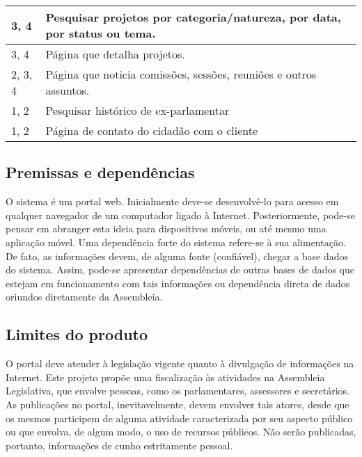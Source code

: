 \documentclass[12pt, a4paper]{article}
\begin{document}
\begin{longtabu}{X[-1, r]| X}
                3, 4 &
                Pesquisar projetos por categoria/natureza, por data, por status
                ou tema.
                \\ \hline

                3, 4 &
                Página que detalha projetos.
                \\ \hline

                2, 3, 4 &
                Página que noticia comissões, sessões, reuniões e outros assuntos.
                \\ \hline

                1, 2 &
                Pesquisar histórico de ex-parlamentar
                \\ \hline

                1, 2 &
                Página de contato do cidadão com o cliente
                \\ \hline
            \end{longtabu}

        \subsection{Premissas e dependências}
        O sistema é um portal web. Inicialmente deve-se desenvolvê-lo para
        acesso em qualquer navegador de um computador ligado à Internet.
        Posteriormente, pode-se pensar em abranger esta ideia para dispositivos
        móveis, ou até mesmo uma aplicação móvel. Uma dependência forte do
        sistema refere-se à sua alimentação. De fato, as informações devem, de
        alguma fonte (confiável), chegar a base dados do sistema. Assim,
        pode-se apresentar dependências de outras bases de dados que estejam em
        funcionamento com tais informações ou dependência direta de dados
        oriundos diretamente da Assembleia.

        \subsection{Limites do produto}
        O portal deve atender à legislação vigente quanto à divulgação de
        informações na Internet. Este projeto propõe uma fiscalização às
        atividades na Assembleia Legislativa, que envolve pessoas, como os
        parlamentares, assessores e secretários. As publicações no portal,
        inevitavelmente, devem envolver tais atores, desde que os mesmos
        participem de alguma atividade caracterizada por seu aspecto público ou
        que envolva, de algum modo, o uso de recursos públicos. Não serão
        publicadas, portanto, informações de cunho estritamente pessoal.
\end{document}
